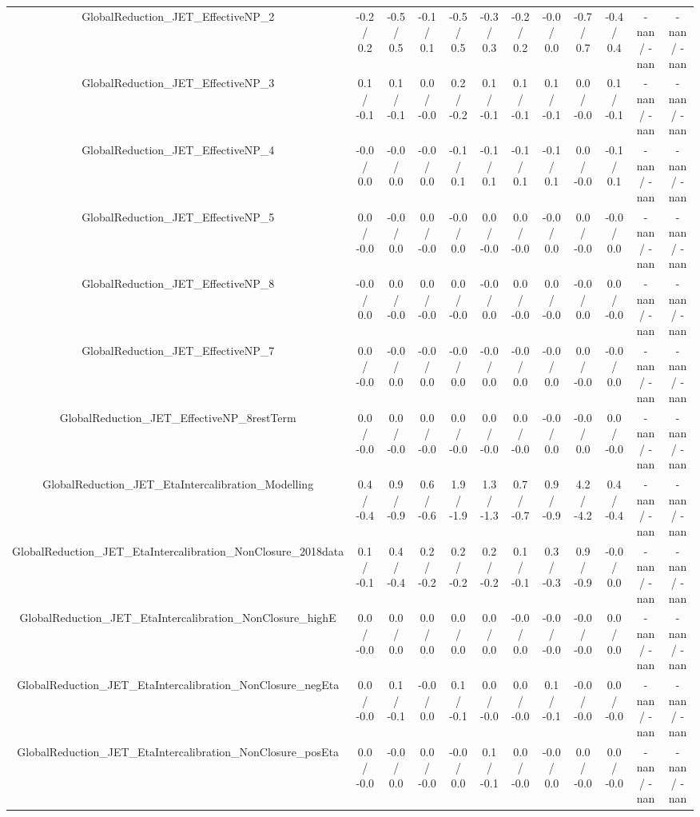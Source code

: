 \begin{table}[htbp]
\begin{center}
\begin{tabular}{|c|c|c|c|c|c|c|c|c|c|c|c|}
  GlobalReduction_JET_EffectiveNP_2 & -0.2 / 0.2 & -0.5 / 0.5 & -0.1 / 0.1 & -0.5 / 0.5 & -0.3 / 0.3 & -0.2 / 0.2 & -0.0 / 0.0 & -0.7 / 0.7 & -0.4 / 0.4 & -nan / -nan & -nan / -nan \\ 
  GlobalReduction_JET_EffectiveNP_3 & 0.1 / -0.1 & 0.1 / -0.1 & 0.0 / -0.0 & 0.2 / -0.2 & 0.1 / -0.1 & 0.1 / -0.1 & 0.1 / -0.1 & 0.0 / -0.0 & 0.1 / -0.1 & -nan / -nan & -nan / -nan \\ 
  GlobalReduction_JET_EffectiveNP_4 & -0.0 / 0.0 & -0.0 / 0.0 & -0.0 / 0.0 & -0.1 / 0.1 & -0.1 / 0.1 & -0.1 / 0.1 & -0.1 / 0.1 & 0.0 / -0.0 & -0.1 / 0.1 & -nan / -nan & -nan / -nan \\ 
  GlobalReduction_JET_EffectiveNP_5 & 0.0 / -0.0 & -0.0 / 0.0 & 0.0 / -0.0 & -0.0 / 0.0 & 0.0 / -0.0 & 0.0 / -0.0 & -0.0 / 0.0 & 0.0 / -0.0 & -0.0 / 0.0 & -nan / -nan & -nan / -nan \\ 
  GlobalReduction_JET_EffectiveNP_8 & -0.0 / 0.0 & 0.0 / -0.0 & 0.0 / -0.0 & 0.0 / -0.0 & -0.0 / 0.0 & 0.0 / -0.0 & 0.0 / -0.0 & -0.0 / 0.0 & 0.0 / -0.0 & -nan / -nan & -nan / -nan \\ 
  GlobalReduction_JET_EffectiveNP_7 & 0.0 / -0.0 & -0.0 / 0.0 & -0.0 / 0.0 & -0.0 / 0.0 & -0.0 / 0.0 & -0.0 / 0.0 & -0.0 / 0.0 & 0.0 / -0.0 & -0.0 / 0.0 & -nan / -nan & -nan / -nan \\ 
  GlobalReduction_JET_EffectiveNP_8restTerm & 0.0 / -0.0 & 0.0 / -0.0 & 0.0 / -0.0 & 0.0 / -0.0 & 0.0 / -0.0 & 0.0 / -0.0 & -0.0 / 0.0 & -0.0 / 0.0 & 0.0 / -0.0 & -nan / -nan & -nan / -nan \\ 
  GlobalReduction_JET_EtaIntercalibration_Modelling & 0.4 / -0.4 & 0.9 / -0.9 & 0.6 / -0.6 & 1.9 / -1.9 & 1.3 / -1.3 & 0.7 / -0.7 & 0.9 / -0.9 & 4.2 / -4.2 & 0.4 / -0.4 & -nan / -nan & -nan / -nan \\ 
  GlobalReduction_JET_EtaIntercalibration_NonClosure_2018data & 0.1 / -0.1 & 0.4 / -0.4 & 0.2 / -0.2 & 0.2 / -0.2 & 0.2 / -0.2 & 0.1 / -0.1 & 0.3 / -0.3 & 0.9 / -0.9 & -0.0 / 0.0 & -nan / -nan & -nan / -nan \\ 
  GlobalReduction_JET_EtaIntercalibration_NonClosure_highE & 0.0 / -0.0 & 0.0 / 0.0 & 0.0 / 0.0 & 0.0 / 0.0 & 0.0 / 0.0 & -0.0 / 0.0 & -0.0 / -0.0 & -0.0 / -0.0 & 0.0 / 0.0 & -nan / -nan & -nan / -nan \\ 
  GlobalReduction_JET_EtaIntercalibration_NonClosure_negEta & 0.0 / -0.0 & 0.1 / -0.1 & -0.0 / 0.0 & 0.1 / -0.1 & 0.0 / -0.0 & 0.0 / -0.0 & 0.1 / -0.1 & -0.0 / -0.0 & 0.0 / -0.0 & -nan / -nan & -nan / -nan \\ 
  GlobalReduction_JET_EtaIntercalibration_NonClosure_posEta & 0.0 / -0.0 & -0.0 / 0.0 & 0.0 / -0.0 & -0.0 / 0.0 & 0.1 / -0.1 & 0.0 / -0.0 & -0.0 / 0.0 & 0.0 / -0.0 & 0.0 / -0.0 & -nan / -nan & -nan / -nan \\ 

\end{tabular}
\end{center}
\end{table}
